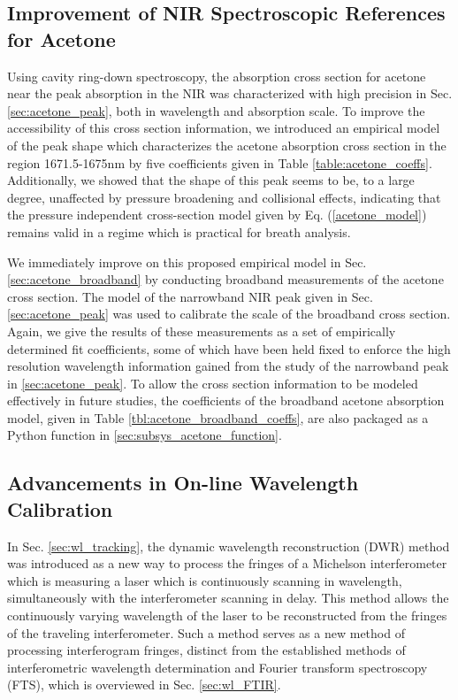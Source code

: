 \documentclass[12pt]{report}
\begin{document}
	\subsection{Improvement of NIR Spectroscopic References for Acetone}
	Using cavity ring-down spectroscopy, the absorption cross section for acetone near the peak absorption in the NIR was characterized with high precision in Sec. \ref{sec:acetone_peak}, both in wavelength and absorption scale. To improve the accessibility of this cross section information, we introduced an empirical model of the peak shape which characterizes the acetone absorption cross section in the region 1671.5-1675nm by five coefficients given in Table \ref{table:acetone_coeffs}. Additionally, we showed that the shape of this peak seems to be, to a large degree, unaffected by pressure broadening and collisional effects, indicating that the pressure independent cross-section model given by Eq. (\ref{acetone_model}) remains valid in a regime which is practical for breath analysis.
	
	We immediately improve on this proposed empirical model in Sec. \ref{sec:acetone_broadband} by conducting broadband measurements of the acetone cross section. The model of the narrowband NIR peak given in Sec. \ref{sec:acetone_peak} was used to calibrate the scale of the broadband cross section. Again, we give the results of these measurements as a set of empirically determined fit coefficients, some of which have been held fixed to enforce the high resolution wavelength information gained from the study of the narrowband peak in \ref{sec:acetone_peak}. To allow the cross section information to be modeled effectively in future studies, the coefficients of the broadband acetone absorption model, given in Table \ref{tbl:acetone_broadband_coeffs}, are also packaged as a Python function in \ref{sec:subsys_acetone_function}.
	
	\subsection{Advancements in On-line Wavelength Calibration}
	In Sec. \ref{sec:wl_tracking}, the dynamic wavelength reconstruction (DWR) method was introduced as a new way to process the fringes of a Michelson interferometer which is measuring a laser which is continuously scanning in wavelength, simultaneously with the interferometer scanning in delay. This method allows the continuously varying wavelength of the laser to be reconstructed from the fringes of the traveling interferometer. Such a method serves as a new method of processing interferogram fringes, distinct from the established methods of interferometric wavelength determination and Fourier transform spectroscopy (FTS), which is overviewed in Sec. \ref{sec:wl_FTIR}.
	
\end{document}
